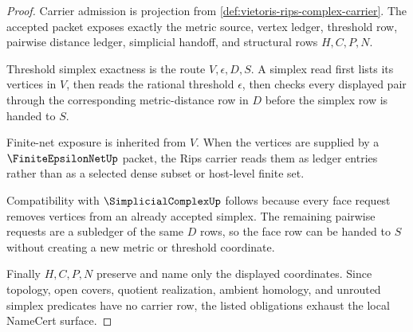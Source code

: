 \begin{proof}
Carrier admission is projection from \autoref{def:vietoris-rips-complex-carrier}. The accepted packet exposes exactly the metric source, vertex ledger, threshold row, pairwise distance ledger, simplicial handoff, and structural rows $H,C,P,N$.

Threshold simplex exactness is the route $V,\epsilon,D,S$. A simplex read first lists its vertices in $V$, then reads the rational threshold $\epsilon$, then checks every displayed pair through the corresponding metric-distance row in $D$ before the simplex row is handed to $S$.

Finite-net exposure is inherited from $V$. When the vertices are supplied by a $\FiniteEpsilonNetUp$ packet, the Rips carrier reads them as ledger entries rather than as a selected dense subset or host-level finite set.

Compatibility with $\SimplicialComplexUp$ follows because every face request removes vertices from an already accepted simplex. The remaining pairwise requests are a subledger of the same $D$ rows, so the face row can be handed to $S$ without creating a new metric or threshold coordinate.

Finally $H,C,P,N$ preserve and name only the displayed coordinates. Since topology, open covers, quotient realization, ambient homology, and unrouted simplex predicates have no carrier row, the listed obligations exhaust the local NameCert surface.
\end{proof}

